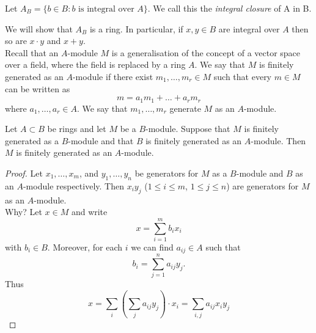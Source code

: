 \documentclass[NumTh.tex]{subfiles}
\begin{document}
Let $A_B = \{ b \in B : b \text{ is integral over } A\}$.
We call this the \emph{integral closure} of A in B.

We will show that $A_B$ is a ring.
In particular, if $x,y \in B$ are integral over $A$ then so are $x \cdot y$ and $x + y$.
\\

Recall that an $A$-module $M$ is a generalisation of the concept of a vector space over a field, where the field is replaced by a ring $A$.
We say that $M$ is finitely generated as an $A$-module if there exist $m_1,\dots,m_r \in M$ such that every $m \in M$ can be written as 
\[ m = a_1 m_1 + \dots + a_r m_r \]
where $a_1,\dots,a_r \in A$.
We say that $m_1,\dots,m_r$ generate $M$ as an $A$-module.


\begin{lemma}\label{l_3_3_1}
  Let $A \subset B$ be rings and let $M$ be a $B$-module.
  Suppose that $M$ is finitely generated as a $B$-module and that $B$ is finitely generated as an $A$-module.
  Then $M$ is finitely generated as an $A$-module.
\end{lemma}

\begin{proof}
  Let $x_1,\dots,x_m$, and $y_1,\dots,y_n$ be generators for $M$ as a $B$-module and $B$ as an $A$-module respectively.
  Then $x_i y_j$ ($1 \leq i \leq m$, $1 \leq j \leq n$) are generators for $M$ as an $A$-module. \\
  Why?
  Let $x \in M$ and write 
  \[ x = \sum_{i=1}^m b_i x_i \] 
  with $b_i \in B$.
  Moreover, for each $i$ we can find $a_{ij} \in A$ such that
  \[ b_i = \sum_{j=1}^n a_{ij} y_j \text{.} \]
  Thus
  \[ x = \sum_i \left( \sum_j a_{ij} y_j \right) \cdot x_i = \sum_{i,j} a_{ij}x_i y_j\]
\end{proof}
\end{document}
